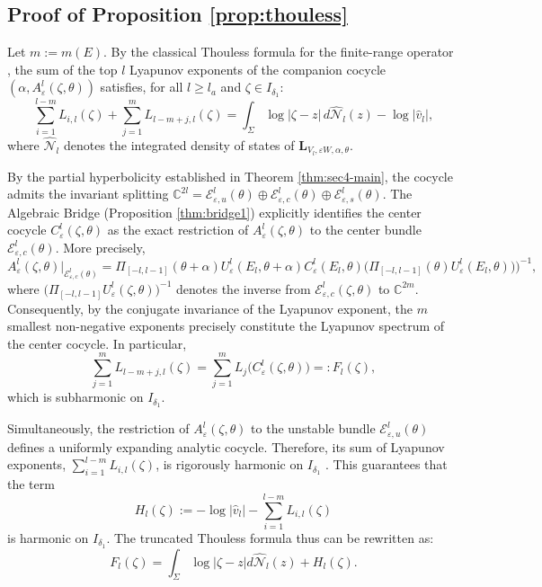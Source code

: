 \documentclass[reqno,11pt]{amsart}
\begin{document}
\subsection*{Proof of Proposition \ref{prop:thouless}}
Let $m := m(E)$. By the classical Thouless formula for the finite-range operator \cite{HaroPuig}, the sum of the top $l$ Lyapunov exponents of the companion cocycle $(\alpha,A^l_\varepsilon(\zeta,\theta))$ satisfies, for all $l \ge l_a$ and $\zeta \in I_{\delta_1}$:
$$\sum_{i=1}^{l-m}L_{i,l}(\zeta) + \sum_{j=1}^{m}L_{l-m+j,l}(\zeta)
=
\int_\Sigma \log|\zeta-z|\,d\widehat{\mathcal{N}}_l(z) - \log|\hat{v}_l|,$$
where $\widehat{\mathcal{N}}_l$ denotes the integrated density of states of $\mathbf{L}_{V_l,\varepsilon W,\alpha,\theta}$. 

By the partial hyperbolicity established in Theorem \ref{thm:sec4-main}, the cocycle admits the invariant splitting $\mathbb{C}^{2l} = \mathcal{E}^l_{\varepsilon,u}(\theta) \oplus \mathcal{E}^l_{\varepsilon,c}(\theta) \oplus \mathcal{E}^l_{\varepsilon,s}(\theta)$. The Algebraic Bridge  (Proposition \ref{thm:bridge1}) explicitly identifies the center cocycle $C^l_\varepsilon(\zeta,\theta)$ as the exact restriction of $A^l_\varepsilon(\zeta,\theta)$ to the center bundle $\mathcal{E}^l_{\varepsilon,c}(\theta)$.
More precisely, $$A^l_\varepsilon(\zeta,\theta)|_{\mathcal{E}^l_{\varepsilon,c}(\theta)}=\Pi_{[-l,l-1]}(\theta+\alpha)U_\varepsilon^l(E_l,\theta+\alpha)C^l_\varepsilon(E_l,\theta)\big(\Pi_{[-l,l-1]}(\theta)U_\varepsilon^l(E_l,\theta))\big)^{-1},$$
where $\big(\Pi_{[-l,l-1]}U_\varepsilon^l(\zeta,\theta)\big)^{-1}$ denotes the inverse from
$\mathcal E_{\varepsilon,c}^l(\zeta,\theta)$ to $\mathbb C^{2m}$.
Consequently, by the conjugate invariance of the Lyapunov exponent, the $m$ smallest non-negative exponents precisely constitute the Lyapunov spectrum of the center cocycle. In particular,
$$\sum_{j=1}^{m}L_{l-m+j,l}(\zeta)
=\sum_{j=1}^{m}L_j\bigl(C_{\varepsilon}^{l}(\zeta,\theta)\bigr)
=: F_l(\zeta),$$
which is subharmonic on $I_{\delta_1}$.

Simultaneously, the restriction of $A^l_{\varepsilon}(\zeta,\theta)$ to the unstable bundle $\mathcal{E}^l_{\varepsilon,u}(\theta)$ defines a uniformly expanding analytic cocycle. Therefore, its sum of Lyapunov exponents, $\sum_{i=1}^{l-m}L_{i,l}(\zeta)$, is rigorously harmonic on $I_{\delta_1}$ \cite{positive,AJS}. This guarantees that the term$$H_l(\zeta) := -\log|\hat{v}_l| - \sum_{i=1}^{l-m}L_{i,l}(\zeta)$$is harmonic on $I_{\delta_1}$. The truncated Thouless formula thus can be rewritten as:
\begin{equation}\label{eq:finitethouless}F_l(\zeta) = \int_{\Sigma}\log|\zeta-z|d\widehat{\mathcal{N}}_l(z) + H_l(\zeta).\end{equation}
\end{document}

